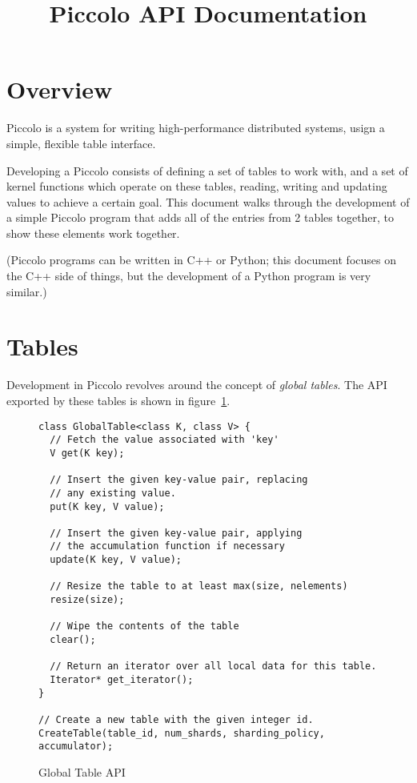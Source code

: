 \documentclass[10pt]{article}
\newcommand{\p}{Piccolo\xspace}
\begin{document}
\date{}
\author{}
\title{Piccolo API Documentation}
\maketitle

\section{Overview}
\p is a system for writing high-performance distributed systems, usign a
simple, flexible table interface.

Developing a \p consists of defining a set of tables to work with, and a set of
kernel functions which operate on these tables, reading, writing and updating
values to achieve a certain goal.  This document walks through the development
of a simple Piccolo program that adds all of the entries from 2 tables together,
to show these elements work together.

(\p programs can be written in C++ or Python; this document focuses on the C++
side of things, but the development of a Python program is very similar.)
 
\section{Tables}
Development in \p revolves around the concept of {\em global tables}.  The API
exported by these tables is shown in figure~\ref{fig:tableapi}.

\begin{figure}[h!]
\begin{lstlisting}
class GlobalTable<class K, class V> {
  // Fetch the value associated with 'key'
  V get(K key);
  
  // Insert the given key-value pair, replacing
  // any existing value.
  put(K key, V value);
  
  // Insert the given key-value pair, applying
  // the accumulation function if necessary
  update(K key, V value);
  
  // Resize the table to at least max(size, nelements)
  resize(size);
  
  // Wipe the contents of the table
  clear();
  
  // Return an iterator over all local data for this table.
  Iterator* get_iterator();
}

// Create a new table with the given integer id.
CreateTable(table_id, num_shards, sharding_policy, accumulator);
\end{lstlisting}
\caption{\sffamily Global Table API \label{fig:tableapi}}
\end{figure}
\end{document}
